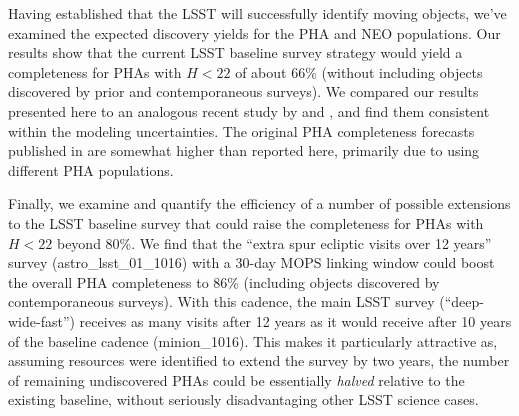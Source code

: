 
Having established that the LSST will successfully identify moving objects, we've examined the expected discovery yields for the PHA and NEO populations. Our results show that the current LSST baseline survey strategy would yield a completeness for PHAs
with $H<22$ of about 66\% (without including objects discovered by prior and contemporaneous surveys). We compared our results presented here to an analogous recent study by \citet[]{GMS2016} and \citet{VeresChesley2017neo}, and find them consistent within the modeling uncertainties. The original
PHA completeness forecasts published in \cite{LSSToverview} are somewhat higher than reported here, primarily due to using different PHA populations. 

Finally, we examine and quantify the efficiency of a number of possible extensions to the LSST baseline survey that could raise the
completeness for PHAs with $H<22$ beyond 80\%. We find that the ``extra spur ecliptic visits over 12 years'' survey
(astro\_lsst\_01\_1016) with a 30-day MOPS linking window could boost the overall PHA completeness to 86\% (including objects discovered by contemporaneous surveys). With this cadence, 
the main LSST survey (``deep-wide-fast'') receives as many visits after 12 years as it would receive after 10 years of the
baseline cadence (minion\_1016). This makes it particularly attractive as, assuming resources were identified to extend the survey by two years, the number of remaining undiscovered PHAs could be essentially {\em halved} relative to the existing baseline, without seriously disadvantaging other LSST science cases.
